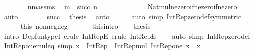 \begin{isabellebody}
\ \ \ \ \ \ \isamarkupfalse%
\ n{\isacharunderscore}{\kern0pt}m{\isacharunderscore}{\kern0pt}assms\ \isamarkupfalse%
\ {\isachardoublequoteopen}m\ {\isacharasterisk}{\kern0pt}\ succ\ n\ {\isasymin}\ {\isasymnat}\ {\isasymsetminus}\ {\isacharbraceleft}{\kern0pt}{}{\isacharbraceright}{\kern0pt}{\isachardoublequoteclose}\isanewline
\ \ \ \ \ \ \ \ \isamarkupfalse%
\ Nat{\isacharunderscore}{\kern0pt}mul{\isacharunderscore}{\kern0pt}ne{\isacharunderscore}{\kern0pt}zero{\isacharunderscore}{\kern0pt}if{\isacharunderscore}{\kern0pt}ne{\isacharunderscore}{\kern0pt}zero{\isacharunderscore}{\kern0pt}if{\isacharunderscore}{\kern0pt}ne{\isacharunderscore}{\kern0pt}zero\ \isamarkupfalse%
\ auto\isanewline
\ \ \ \ \ \ \isamarkupfalse%
\ succ\ \isamarkupfalse%
\ {\isacharquery}{\kern0pt}thesis\ \isamarkupfalse%
\ auto\isanewline
\ \ \ \ \isamarkupfalse%
\ {\isacharparenleft}{\kern0pt}auto\ simp{\isacharcolon}{\kern0pt}\ Int{\isacharunderscore}{\kern0pt}Rep{\isacharunderscore}{\kern0pt}zero{\isacharunderscore}{\kern0pt}def{\isacharbrackleft}{\kern0pt}symmetric{\isacharbrackright}{\kern0pt}{\isacharparenright}{\kern0pt}\isanewline
\ \ \ \ \isamarkupfalse%
\ this\ nonneg{\isacharunderscore}{\kern0pt}neg\isanewline
\ \ \isacommand{{\isacharbraceright}{\kern0pt}}\isamarkupfalse%
\isanewline
\ \ \isamarkupfalse%
\ this{\isacharbrackleft}{\kern0pt}intro{\isacharbang}{\kern0pt}{\isacharbrackright}{\kern0pt}\isanewline
\ \ \isamarkupfalse%
\ {\isacharquery}{\kern0pt}thesis\ \isamarkupfalse%
\ {\isacharparenleft}{\kern0pt}intro\ Dep{\isacharunderscore}{\kern0pt}fun{\isacharunderscore}{\kern0pt}typeI{\isacharcomma}{\kern0pt}\ erule\ Int{\isacharunderscore}{\kern0pt}RepE{\isacharsemicolon}{\kern0pt}\ erule\ Int{\isacharunderscore}{\kern0pt}RepE{\isacharparenright}{\kern0pt}\isanewline
\ \ \ \ {\isacharparenleft}{\kern0pt}auto\ simp{\isacharcolon}{\kern0pt}\ Int{\isacharunderscore}{\kern0pt}Rep{\isacharunderscore}{\kern0pt}zero{\isacharunderscore}{\kern0pt}def{\isacharparenright}{\kern0pt}\isanewline
{}\isamarkupfalse%
%
\endisatagproof
{\isafoldproof}%
%
\isadelimproof
\isanewline
%
\endisadelimproof
\isanewline
{}\isamarkupfalse%
\ Int{\isacharunderscore}{\kern0pt}Rep{\isacharunderscore}{\kern0pt}one{\isacharunderscore}{\kern0pt}mul{\isacharunderscore}{\kern0pt}eq\ {\isacharbrackleft}{\kern0pt}simp{\isacharbrackright}{\kern0pt}{\isacharcolon}{\kern0pt}\ {\isachardoublequoteopen}x\ {\isacharcolon}{\kern0pt}\ Int{\isacharunderscore}{\kern0pt}Rep\ {\isasymLongrightarrow}\ Int{\isacharunderscore}{\kern0pt}Rep{\isacharunderscore}{\kern0pt}mul\ Int{\isacharunderscore}{\kern0pt}Rep{\isacharunderscore}{\kern0pt}one\ x\ {\isacharequal}{\kern0pt}\ x{\isachardoublequoteclose}\isanewline

\end{isabellebody}
